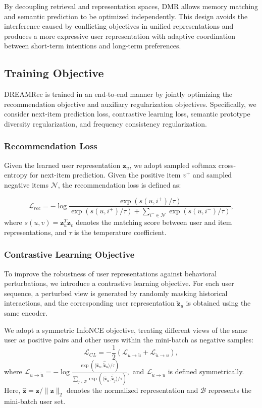 \documentclass[letterpaper]{article} %
\theoremstyle{definition} %
\begin{document}
By decoupling retrieval and representation spaces, DMR allows memory matching and semantic prediction to be optimized independently. 
This design avoids the interference caused by conflicting objectives in unified representations and produces a more expressive user representation with adaptive coordination between short-term intentions and long-term preferences.
\subsection{Training Objective}

DREAMRec is trained in an end-to-end manner by jointly optimizing the recommendation objective and auxiliary regularization objectives. Specifically, we consider next-item prediction loss, contrastive learning loss, semantic prototype diversity regularization, and frequency consistency regularization.


\subsubsection{Recommendation Loss}

Given the learned user representation $\bm{z}_u$, we adopt sampled softmax cross-entropy for next-item prediction. Given the positive item $v^{+}$ and sampled negative items $\mathcal{N}$, the recommendation loss is defined as:

\begin{equation}
\mathcal{L}_{rec}
=
-\log
\frac{
\exp(s(u,i^+)/\tau)
}
{
\exp(s(u,i^+)/\tau)
+
\sum_{i^-\in\mathcal{N}}
\exp(s(u,i^-)/\tau)
},
\end{equation}
where $s(u,v)=\bm{z}_u^T\bm{z}_v$ denotes the matching score between user and item representations, and $\tau$ is the temperature coefficient.


\subsubsection{Contrastive Learning Objective}

To improve the robustness of user representations against behavioral perturbations, we introduce a contrastive learning objective. For each user sequence, a perturbed view is generated by randomly masking historical interactions, and the corresponding user representation $\widetilde{\bm{z}}_u$ is obtained using the same encoder.

We adopt a symmetric InfoNCE objective, treating different views of the same user as positive pairs and other users within the mini-batch as negative samples:
\begin{equation}
\mathcal{L}_{CL}
=
-\frac{1}{2}
(\mathcal{L}_{u\rightarrow \tilde{u}}
+
\mathcal{L}_{\tilde{u}\rightarrow u}),
\end{equation}
where $
\mathcal{L}_{u\rightarrow \tilde{u}}
=
-\log
\frac{
\exp(
\langle
\hat{\bm z}_u,
\hat{\tilde{\bm z}}_u
\rangle/\tau)
}
{
\sum_{j\in\mathcal{B}}
\exp(
\langle
\hat{\bm z}_u,
\hat{\tilde{\bm z}}_j
\rangle/\tau)
},
$
and $\mathcal{L}_{\tilde{u}\rightarrow u}$ is defined symmetrically. Here,
$\hat{\bm z}=\bm z/\|\bm z\|_2$ denotes the normalized representation and $\mathcal{B}$ represents the mini-batch user set.
\end{document}
